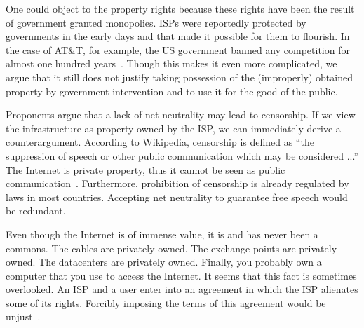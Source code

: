 One could object to the property rights because these rights have been the result of government granted monopolies. \acp{ISP} were reportedly protected by governments in the early days and that made it possible for them to flourish. In the case of AT\&T, for example, the US government banned any competition for almost one hundred years~\cite{oa2014objectivists}. Though this makes it even more complicated, we argue that it still does not justify taking possession of the (improperly) obtained property by government intervention and to use it for the good of the public.

Proponents argue that a lack of net neutrality may lead to censorship. If we view the infrastructure as property owned by the \ac{ISP}, we can immediately derive a counterargument. According to Wikipedia, censorship is defined as ``the suppression of speech or other public communication which may be considered ...'' The Internet is private property, thus it cannot be seen as public communication~\cite{falkvinge2014agree}. Furthermore, prohibition of censorship is already regulated by laws in most countries. Accepting net neutrality to guarantee free speech would be redundant.




Even though the Internet is of immense value, it is and has never been a commons. The cables are privately owned. The exchange points are privately owned. The datacenters are privately owned. Finally, you probably own a computer that you use to access the Internet. It seems that this fact is sometimes overlooked. An \ac{ISP} and a user enter into an agreement in which the \ac{ISP} alienates some of its rights. Forcibly imposing the terms of this agreement would be unjust~\cite{tech2014deon}.